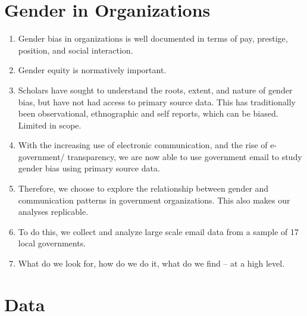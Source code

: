 \documentclass[fleqn]{MJDArticle}
\begin{document}

\section{Gender in Organizations}

\begin{enumerate}
	\item Gender bias in organizations is well documented in terms of pay, prestige, position, and social interaction. 
	\item Gender equity is normatively important.
	\item Scholars have sought to understand the roots, extent, and nature of gender bias, but have not had access to primary source data. This has traditionally been observational, ethnographic and self reports, which can be biased. Limited in scope. 
	\item With the increasing use of electronic communication, and the rise of e-government/ transparency, we are now able to use government email to study gender bias using primary source data.
	\item Therefore, we choose to explore the relationship between gender and communication patterns in government organizations. This also makes our analyses replicable. 
	\item To do this, we collect and analyze large scale email data from a sample of 17 local governments.  
	\item What do we look for, how do we do it,  what do we find -- at a high level. 
\end{enumerate}

\section{Data}
\end{document}
